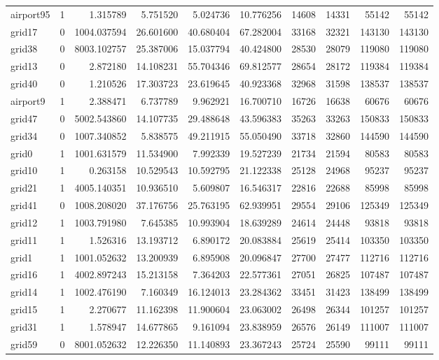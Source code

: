 \begin{longtable}{|l|r|r|r|r|r|r|r|r|r|}
airport95 & 1 & 1.315789 & 5.751520 & 5.024736 & 10.776256 & 14608 & 14331 & 55142 & 55142 \\
grid17 & 0 & 1004.037594 & 26.601600 & 40.680404 & 67.282004 & 33168 & 32321 & 143130 & 143130 \\
grid38 & 0 & 8003.102757 & 25.387006 & 15.037794 & 40.424800 & 28530 & 28079 & 119080 & 119080 \\
grid13 & 0 & 2.872180 & 14.108231 & 55.704346 & 69.812577 & 28654 & 28172 & 119384 & 119384 \\
grid40 & 0 & 1.210526 & 17.303723 & 23.619645 & 40.923368 & 32968 & 31598 & 138537 & 138537 \\
airport9 & 1 & 2.388471 & 6.737789 & 9.962921 & 16.700710 & 16726 & 16638 & 60676 & 60676 \\
grid47 & 0 & 5002.543860 & 14.107735 & 29.488648 & 43.596383 & 35263 & 33263 & 150833 & 150833 \\
grid34 & 0 & 1007.340852 & 5.838575 & 49.211915 & 55.050490 & 33718 & 32860 & 144590 & 144590 \\
grid0 & 1 & 1001.631579 & 11.534900 & 7.992339 & 19.527239 & 21734 & 21594 & 80583 & 80583 \\
grid10 & 1 & 0.263158 & 10.529543 & 10.592795 & 21.122338 & 25128 & 24968 & 95237 & 95237 \\
grid21 & 1 & 4005.140351 & 10.936510 & 5.609807 & 16.546317 & 22816 & 22688 & 85998 & 85998 \\
grid41 & 0 & 1008.208020 & 37.176756 & 25.763195 & 62.939951 & 29554 & 29106 & 125349 & 125349 \\
grid12 & 1 & 1003.791980 & 7.645385 & 10.993904 & 18.639289 & 24614 & 24448 & 93818 & 93818 \\
grid11 & 1 & 1.526316 & 13.193712 & 6.890172 & 20.083884 & 25619 & 25414 & 103350 & 103350 \\
grid1 & 1 & 1001.052632 & 13.200939 & 6.895908 & 20.096847 & 27700 & 27477 & 112716 & 112716 \\
grid16 & 1 & 4002.897243 & 15.213158 & 7.364203 & 22.577361 & 27051 & 26825 & 107487 & 107487 \\
grid14 & 1 & 1002.476190 & 7.160349 & 16.124013 & 23.284362 & 33451 & 31423 & 138499 & 138499 \\
grid15 & 1 & 2.270677 & 11.162398 & 11.900604 & 23.063002 & 26498 & 26344 & 101257 & 101257 \\
grid31 & 1 & 1.578947 & 14.677865 & 9.161094 & 23.838959 & 26576 & 26149 & 111007 & 111007 \\
grid59 & 0 & 8001.052632 & 12.226350 & 11.140893 & 23.367243 & 25724 & 25590 & 99111 & 99111 \\

\end{longtable}
